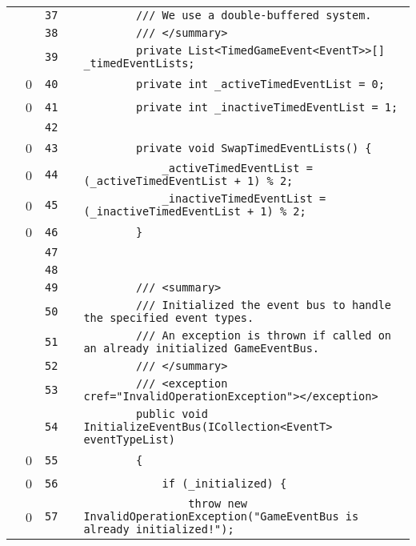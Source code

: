 \documentclass[a4paper,landscape,10pt]{article}
\begin{document}
\begin{longtable}[l]{lrrll}
\cellcolor{gray} &  & \verb~37~ & & \verb~        /// We use a double-buffered system.~\\
\cellcolor{gray} &  & \verb~38~ & & \verb~        /// </summary>~\\
\cellcolor{gray} &  & \verb~39~ & & \verb~        private List<TimedGameEvent<EventT>>[] _timedEventLists;~\\
\cellcolor{red} & 0 & \verb~40~ & & \verb~        private int _activeTimedEventList = 0;~\\
\cellcolor{red} & 0 & \verb~41~ & & \verb~        private int _inactiveTimedEventList = 1;~\\
\cellcolor{gray} &  & \verb~42~ & & \verb~~\\
\cellcolor{red} & 0 & \verb~43~ & & \verb~        private void SwapTimedEventLists() {~\\
\cellcolor{red} & 0 & \verb~44~ & & \verb~            _activeTimedEventList = (_activeTimedEventList + 1) % 2;~\\
\cellcolor{red} & 0 & \verb~45~ & & \verb~            _inactiveTimedEventList = (_inactiveTimedEventList + 1) % 2;~\\
\cellcolor{red} & 0 & \verb~46~ & & \verb~        }~\\
\cellcolor{gray} &  & \verb~47~ & & \verb~~\\
\cellcolor{gray} &  & \verb~48~ & & \verb~~\\
\cellcolor{gray} &  & \verb~49~ & & \verb~        /// <summary>~\\
\cellcolor{gray} &  & \verb~50~ & & \verb~        /// Initialized the event bus to handle the specified event types.~\\
\cellcolor{gray} &  & \verb~51~ & & \verb~        /// An exception is thrown if called on an already initialized GameEventBus.~\\
\cellcolor{gray} &  & \verb~52~ & & \verb~        /// </summary>~\\
\cellcolor{gray} &  & \verb~53~ & & \verb~        /// <exception cref="InvalidOperationException"></exception>~\\
\cellcolor{gray} &  & \verb~54~ & & \verb~        public void InitializeEventBus(ICollection<EventT> eventTypeList)~\\
\cellcolor{red} & 0 & \verb~55~ & & \verb~        {~\\
\cellcolor{red} & 0 & \verb~56~ & & \verb~            if (_initialized) {~\\
\cellcolor{red} & 0 & \verb~57~ & & \verb~                throw new InvalidOperationException("GameEventBus is already initialized!");~\\

\end{longtable}
\end{document}
